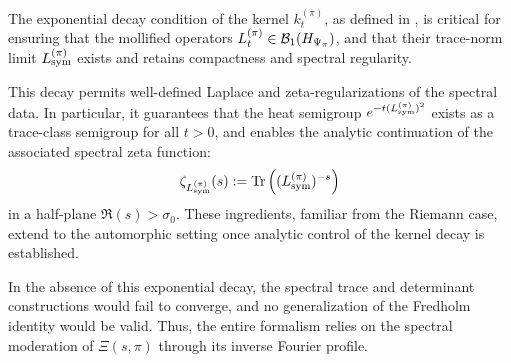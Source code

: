 \begin{remark}
\label{rem:generalized_trace_decay}
The exponential decay condition of the kernel \( k_t^{(\pi)} \), as defined in , is critical for ensuring that the mollified operators \( L_t^{(\pi)} \in \mathcal{B}_1(H_{\Psi_{\pi}}) \), and that their trace-norm limit \( L_{\mathrm{sym}}^{(\pi)} \) exists and retains compactness and spectral regularity.

This decay permits well-defined Laplace and zeta-regularizations of the spectral data. In particular, it guarantees that the heat semigroup \( e^{-t (L_{\mathrm{sym}}^{(\pi)})^2} \) exists as a trace-class semigroup for all \( t > 0 \), and enables the analytic continuation of the associated spectral zeta function:
\[
\zeta_{L_{\mathrm{sym}}^{(\pi)}}(s) := \operatorname{Tr}\left( (L_{\mathrm{sym}}^{(\pi)})^{-s} \right)
\]
in a half-plane \( \Re(s) > \sigma_0 \). These ingredients, familiar from the Riemann case, extend to the automorphic setting once analytic control of the kernel decay is established.

In the absence of this exponential decay, the spectral trace and determinant constructions would fail to converge, and no generalization of the Fredholm identity would be valid. Thus, the entire formalism relies on the spectral moderation of \( \Xi(s, \pi) \) through its inverse Fourier profile.
\end{remark}
